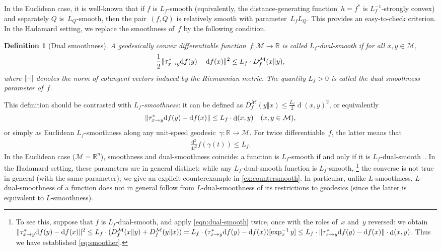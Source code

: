 \documentclass[11pt,letterpaper]{article}
\newtheorem{definition}[theorem]{Definition}\AddToHook{env/definition/begin}{\crefalias{theorem}{definition}}
\numberwithin{equation}{section}
\newcommand{\RR}{\mathbb{R}}
\newcommand{\diff}{\mathrm{d}}
\newcommand{\MM}{\mathcal{M}}
\DeclareMathOperator{\dist}{d}
\DeclarePairedDelimiter\norm{\lVert}{\rVert}
\begin{document}
In the Euclidean case, it is well-known that if $f$ is $L_f$-smooth (equivalently, the distance-ge\-ne\-ra\-ting function~$h=f^*$ is $L_f^{-1}$-strongly convex) and separately $Q$ is~$L_Q$-smooth, then the pair~$(f,Q)$ is relatively smooth with parameter~$L_f L_Q$.
This provides an easy-to-check criterion.
In the Hadamard setting, we replace the smoothness of~$f$ by the following condition.

\begin{definition}[Dual smoothness]\label{def:dual smooth}
    A geodesically convex differentiable function~$f \colon \MM \to \RR$ is called \emph{$L_f$-dual-smooth} if for all $x,y \in \MM$,
    \begin{equation}\label{eqn:dual-smooth}
        \frac12 \norm{ \tau^{\ast}_{x \to y}\diff f(y) - \diff f(x) }^2 \leq L_f \cdot D_f^\MM(x\Vert y),
    \end{equation}
    where $\norm{\cdot}$ denotes the norm of cotangent vectors induced by the Riemannian metric.
    The quantity $L_f>0$ is called the dual smoothness parameter of~$f$.
\end{definition}

\noindent
This definition should be contrasted with \emph{$L_f$-smoothness}: it can be defined as $D_f^{\MM}(y\Vert x) \leq \frac {L_f}2 \dist(x,y)^2$, or equivalently
\begin{align}\label{eq:smoother}
\norm{ \tau^{\ast}_{x \to y}\diff f(y) - \diff f(x) }
\leq L_f \cdot \dist(x,y)
    \quad (x, y \in \MM),
\end{align}
or simply as Euclidean $L_f$-smoothness along any unit-speed geodesic~$\gamma \colon \RR \to \MM$.
For twice differentiable~$f$, the latter means that
\begin{align}\label{eq:smooth}
    \frac{\diff^2}{\diff t^2} f(\gamma(t)) \leq L_f.
\end{align}
In the Euclidean case ($\MM = \RR^n$), smoothness and dual-smoothness coincide:
a function is $L_f$-smooth if and only if it is $L_f$-dual-smooth~\cite[Thm.~5.8]{Beck2017}.
In the Hadamard setting, these parameters are in general distinct:
while any $L_f$-dual-smooth function is $L_f$-smooth,%
\footnote{
To see this, suppose that $f$ is $L_f$-dual-smooth, and apply \cref{eqn:dual-smooth} twice, once with the roles of~$x$ and~$y$ reversed:
we obtain
$\norm{ \tau^{\ast}_{x \to y}\diff f(y) - \diff f(x) }^2
\leq L_f \cdot ( D_f^\MM(x\Vert y) + D_f^\MM(y\Vert x) )
= L_f \cdot (\tau^{\ast}_{x \to y}\diff f(y) - \diff f(x))[\exp_{x}^{-1}y]
\leq L_f \cdot \norm{ \tau^{\ast}_{x \to y}\diff f(y) - \diff f(x) } \cdot\dist(x,y)$.
Thus we have established \cref{eq:smoother}.}
the converse is not true in general (with the same parameter); we give an explicit counterexample in \cref{ex:countersmooth}.
In particular, unlike $L$-smoothness, $L$-dual-smoothness of a function does not in general follow from $L$-dual-smoothness of its restrictions to geodesics (since the latter is equivalent to $L$-smoothness).
\end{document}
